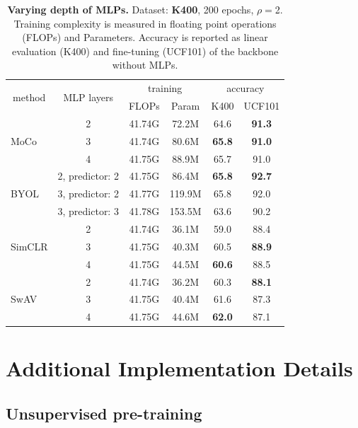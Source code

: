 \documentclass[final]{cvpr}
\newcommand{\tablestyle}[2]{\setlength{\tabcolsep}{#1}\renewcommand{\arraystretch}{#2}\centering\footnotesize}
\begin{document}
\begin{table}[t!] 
	\centering
	\tablestyle{3pt}{1.05} 
	\tablestyle{6.4pt}{1.0}	
	\vspace{-10pt}
	\begin{tabular}{l|c|cc|cc}
		\multicolumn{1}{c|}{\multirow{2}{*}{method}} & \multirow{2}{*}{MLP layers} & \multicolumn{2}{c}{training} & \multicolumn{2}{c}{accuracy} \\
		& & FLOPs & Param & K400 & UCF101  \\
		\hline
		\multirow{3}{*}{MoCo} & 2 & 41.74G & 72.2M & 64.6 & \textbf{91.3} \\
		& 3 & 41.74G & 80.6M & \textbf{{65.8}} &\textbf{{91.0}} \\
		& 4 & 41.75G & 88.9M  & 65.7 & 91.0 \\
		\hline
		\multirow{3}{*}{BYOL} & 2, predictor: 2 & 41.75G & 86.4M & {\textbf{65.8}} & \textbf{{92.7}} \\
		& 3, predictor: 2 & 41.77G &  119.9M & {65.8} & 92.0  \\
		& 3, predictor: 3 & 41.78G &  153.5M & 63.6 & 90.2  \\
		\hline
		\multirow{3}{*}{SimCLR} & 2 & 41.74G & 36.1M & 59.0	& 88.4 \\
		& 3 & 41.75G & 40.3M & 60.5	& \textbf{{88.9}} \\
		& 4 & 41.75G & 44.5M  & \textbf{{60.6}}	& 88.5 \\
		\hline
		\multirow{3}{*}{SwAV} & 2 & 41.74G & 36.2M & 60.3 &	\textbf{88.1} \\
		& 3 & 41.75G & 40.4M & 61.6 & 87.3 \\
		& 4 & 41.75G & 44.6M  & \textbf{62.0} &87.1 \\
	\end{tabular}

	\caption{\textbf{Varying depth of MLPs.} Dataset: \textbf{K400}, 200 epochs, $\rho{=}$2. Training complexity is measured in floating point operations (FLOPs) and Parameters. Accuracy is reported as linear evaluation (K400) and fine-tuning (UCF101) of the backbone without MLPs. }
	\label{tab:mlp}
		\vspace{-.5em}
\end{table}


\section{Additional Implementation Details} \label{sec:impl_details} 

\subsection{Unsupervised pre-training}   \label{sec:training} 
\end{document}
